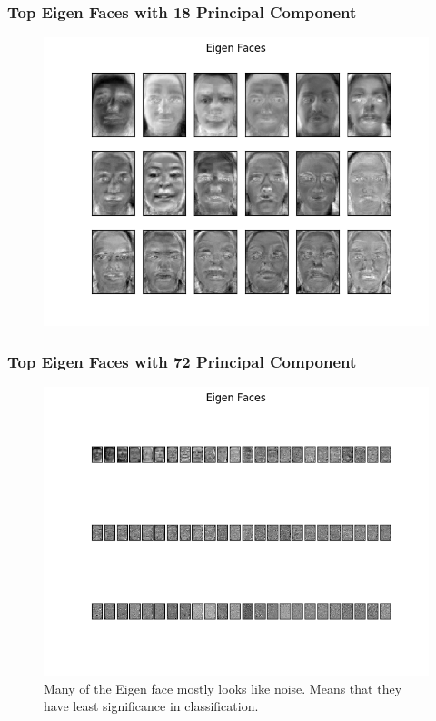 \documentclass[11pt]{beamer}
\begin{document}
\begin{frame}
\frametitle{Top Eigen Faces with 18 Principal Component}
\begin{figure}
\includegraphics[width=.95\textwidth]{eigen_face_U_18.png}
\end{figure}
\end{frame}

\begin{frame}
\frametitle{Top Eigen Faces with 72 Principal Component}
\begin{figure}
\includegraphics[width=.8\textwidth]{eigen_face_U_72.png}
\caption{Many of the Eigen face mostly looks like noise. Means that they have least significance in classification.}
\end{figure}
\end{frame}
\end{document}
